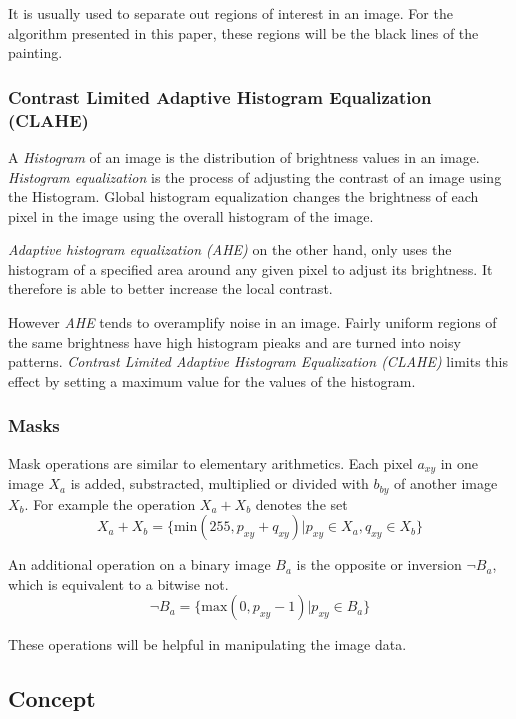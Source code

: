 \documentclass[serif,article,noparskip]{agse-thesis}
\begin{document}
It is usually used to separate out regions of interest in an image. For the
algorithm presented in this paper, these regions will be the black lines of the
painting.

\subsubsection{Contrast Limited Adaptive Histogram
Equalization (CLAHE)} \label{clahe}

A \textit{Histogram} of an image is the distribution of brightness values in an
image. \textit{Histogram equalization} is the process of adjusting the contrast
of an image using the Histogram. Global histogram equalization changes the
brightness of each pixel in the image using the overall histogram of the image.
\cite{ShapiroLindaG2001Cv}

\textit{Adaptive histogram equalization (AHE)} on the other hand, only uses the
histogram of a specified area around any given pixel to adjust its brightness. It
therefore is able to better increase the local contrast.

However \textit{AHE} tends to overamplify noise in an image. Fairly uniform
regions of the same brightness have high histogram pieaks and are turned into
noisy patterns.  \textit{Contrast Limited Adaptive Histogram Equalization
(CLAHE)} limits this effect by setting a maximum value for the values of the
histogram. \cite{Pizer1987}

\subsubsection{Masks}

Mask operations are similar to elementary arithmetics. Each pixel $a_{xy}$ in
one image  $X_a$ is added, substracted, multiplied or divided with $b_{by}$ of
another image $X_b$. For example the operation $X_a + X_b$ denotes the set
$$X_a + X_b = \{\mathrm{min}(255, p_{xy} + q_{xy}) | p_{xy} \in X_a, q_{xy} \in X_b\}$$

An additional operation on a binary image $B_a$ is the opposite or inversion
$\neg B_a$, which is equivalent to a bitwise not.
$$\neg B_a = \{\mathrm{max}(0,p_{xy} - 1) | p_{xy} \in B_a\}$$

These operations will be helpful in manipulating the image data.

\subsection{Concept} \label{concept}
\end{document}
